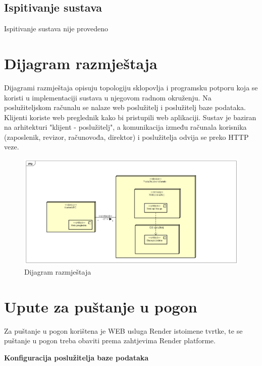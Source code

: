 			\subsection{Ispitivanje sustava}
			
			Ispitivanje sustava nije provedeno
		
		\section{Dijagram razmještaja}
			
			 Dijagrami razmještaja opisuju topologiju sklopovlja i programsku potporu koja se koristi u implementaciji sustava u njegovom radnom okruženju. Na poslužiteljskom računalu se nalaze web poslužitelj i poslužitelj baze podataka. Klijenti koriste web preglednik kako bi pristupili web aplikaciji. Sustav je baziran na arhitekturi "klijent - poslužitelj", a komunikacija između računala korisnika (zaposlenik, revizor, računovođa, direktor) i poslužitelja odvija se preko HTTP veze.

			 \begin{figure}[H]
				\includegraphics[scale=0.45]{slike/dijagram_razmjestaja.png} %
				\centering
				\caption{Dijagram razmještaja}
				\label{fig:promjene}
			\end{figure}
			
			\eject 
		
		\section{Upute za puštanje u pogon}
		
			 
			Za puštanje u pogon korištena je WEB usluga Render istoimene tvrtke, te se puštanje u pogon treba obaviti prema zahtjevima Render platforme. 
			 	
			 \textbf{Konfiguracija poslužitelja baze podataka}
			 
